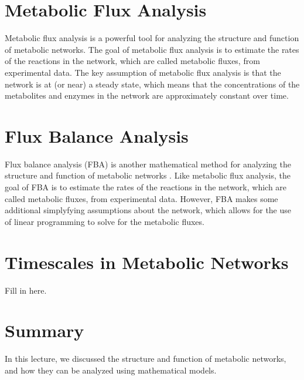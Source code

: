 \documentclass{article}[12pt]
\begin{document}
\section{Metabolic Flux Analysis}
Metabolic flux analysis is a powerful tool for analyzing the structure and function of metabolic networks.
The goal of metabolic flux analysis is to estimate the rates of the reactions in the network, which are called metabolic fluxes, from experimental data.
The key assumption of metabolic flux analysis is that the network is at (or near) a steady state, which means that the concentrations of the metabolites and enzymes in the network are approximately constant over time.

\section{Flux Balance Analysis}
Flux balance analysis (FBA) is another mathematical method for analyzing the structure and function of metabolic networks \cite{Orth:2010aa}.
Like metabolic flux analysis, the goal of FBA is to estimate the rates of the reactions in the network, which are called metabolic fluxes, from experimental data.
However, FBA makes some additional simplyfying assumptions about the network, which allows for the use of linear programming to solve for the metabolic fluxes.

\section{Timescales in Metabolic Networks}
Fill in here.

\section{Summary}
In this lecture, we discussed the structure and function of metabolic networks, and how they can be analyzed using mathematical models.






\end{document}
